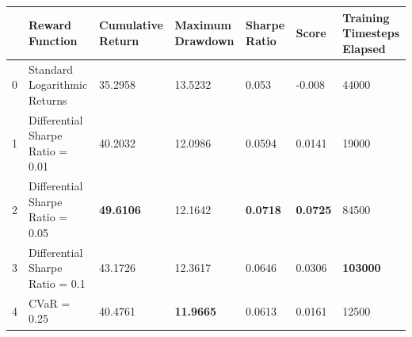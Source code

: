 \begin{tabular}{lllllll}
\toprule
 & Reward Function & Cumulative Return & Maximum Drawdown & Sharpe Ratio & Score & Training Timesteps Elapsed \\
\midrule
0 & Standard Logarithmic Returns & 35.2958 & 13.5232 & 0.053 & -0.008 & 44000 \\
1 & Differential Sharpe Ratio = 0.01 & 40.2032 & 12.0986 & 0.0594 & 0.0141 & 19000 \\
2 & Differential Sharpe Ratio = 0.05 & \textbf{49.6106} & 12.1642 & \textbf{0.0718} & \textbf{0.0725} & 84500 \\
3 & Differential Sharpe Ratio = 0.1 & 43.1726 & 12.3617 & 0.0646 & 0.0306 & \textbf{103000} \\
4 & CVaR = 0.25 & 40.4761 & \textbf{11.9665} & 0.0613 & 0.0161 & 12500 \\
\bottomrule
\end{tabular}
